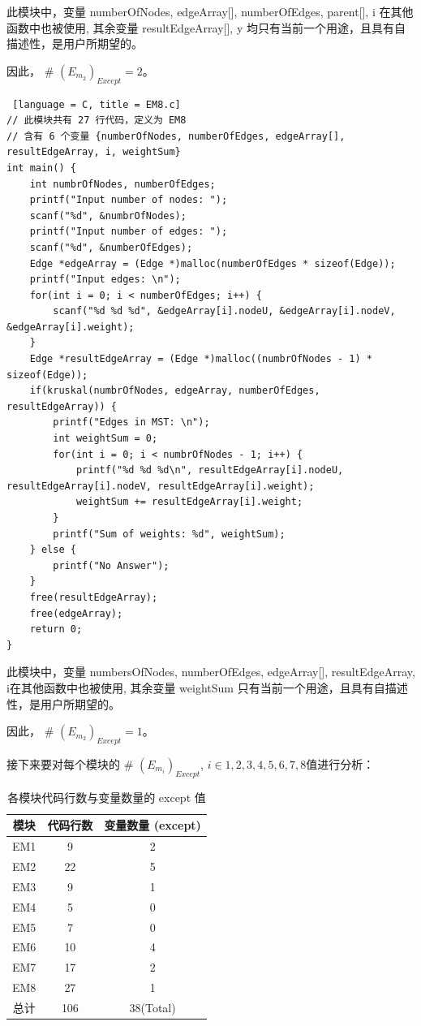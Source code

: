 \documentclass[14pt,a4paper,UTF8,twoside]{article}
\begin{document}
此模块中，变量 numberOfNodes, edgeArray[], numberOfEdges, parent[], i 在其他函数中也被使用, 
其余变量 resultEdgeArray[], y 均只有当前一个用途，且具有自描述性，是用户所期望的。

因此， \# $(E_{m_2})_{Except} = 2$。

\begin{lstlisting} [language = C, title = EM8.c]
// 此模块共有 27 行代码，定义为 EM8
// 含有 6 个变量 {numberOfNodes, numberOfEdges, edgeArray[], resultEdgeArray, i, weightSum}
int main() {
    int numbrOfNodes, numberOfEdges;
    printf("Input number of nodes: ");
    scanf("%d", &numbrOfNodes);
    printf("Input number of edges: ");
    scanf("%d", &numberOfEdges);
    Edge *edgeArray = (Edge *)malloc(numberOfEdges * sizeof(Edge));
    printf("Input edges: \n");
    for(int i = 0; i < numberOfEdges; i++) {
        scanf("%d %d %d", &edgeArray[i].nodeU, &edgeArray[i].nodeV, &edgeArray[i].weight);
    }
    Edge *resultEdgeArray = (Edge *)malloc((numbrOfNodes - 1) * sizeof(Edge));
    if(kruskal(numbrOfNodes, edgeArray, numberOfEdges, resultEdgeArray)) {
        printf("Edges in MST: \n");
        int weightSum = 0;
        for(int i = 0; i < numbrOfNodes - 1; i++) {
            printf("%d %d %d\n", resultEdgeArray[i].nodeU, resultEdgeArray[i].nodeV, resultEdgeArray[i].weight);
            weightSum += resultEdgeArray[i].weight;
        }
        printf("Sum of weights: %d", weightSum);
    } else {
        printf("No Answer");
    }
    free(resultEdgeArray);
    free(edgeArray);
    return 0;
}
\end{lstlisting}

此模块中，变量 numbersOfNodes, numberOfEdges, edgeArray[], resultEdgeArray, i在其他函数中也被使用, 
其余变量 weightSum 只有当前一个用途，且具有自描述性，是用户所期望的。

因此， \# $(E_{m_2})_{Except} = 1$。

接下来要对每个模块的 \# $(E_{m_i})_{Except}$, $ i \in {1,2,3,4,5,6,7,8} $值进行分析：

\begin{table}[H]
    \centering
    \begin{tabular}{|c|c|c|}
    \hline
    \textbf{模块} & \textbf{代码行数} & \textbf{变量数量 (except)} \\ \hline
    EM1 & 9 & 2 \\ \hline
    EM2 & 22 & 5 \\ \hline
    EM3 & 9 & 1 \\ \hline
    EM4 & 5 & 0 \\ \hline
    EM5 & 7 & 0 \\ \hline
    EM6 & 10 & 4 \\ \hline
    EM7 & 17 & 2 \\ \hline
    EM8 & 27 & 1 \\ \hline
    总计 & 106 & 38(Total) \\ \hline
    \end{tabular}
    \caption{各模块代码行数与变量数量的 except 值}
\end{table}
    
\end{document}
